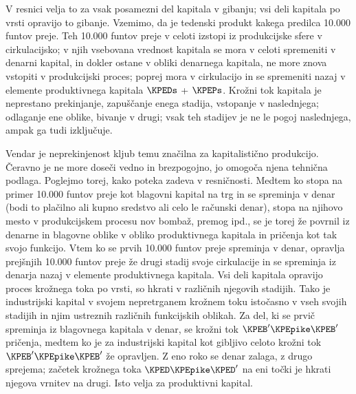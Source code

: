 \documentclass[kapital_02.tex]{subfiles}
\begin{document}
V resnici velja to za vsak posamezni del kapitala v gibanju; vsi deli kapitala po vrsti opravijo to gibanje. Vzemimo, da je tedenski produkt kakega predilca 10.000 funtov preje. Teh 10.000 funtov preje v celoti izstopi iz produkcijske sfere v cirkulacijsko; v njih vsebovana vrednost kapitala se mora v celoti spremeniti v denarni kapital, in dokler ostane v obliki denarnega kapitala, ne more znova vstopiti v produkcijski proces; poprej mora v cirkulacijo in se spremeniti nazaj v elemente produktivnega kapitala \( \KPEDs \) + \( \KPEPs \). Krožni tok kapitala je neprestano prekinjanje, zapuščanje enega stadija, vstopanje v naslednjega; odlaganje ene oblike, bivanje v drugi; vsak teh stadijev je ne le pogoj naslednjega, ampak ga tudi izključuje.

Vendar je neprekinjenost kljub temu značilna za kapitalistično produkcijo. Čeravno je ne more doseči vedno in brezpogojno, jo omogoča njena tehnična podlaga. Poglejmo torej, kako poteka zadeva v resničnosti. Medtem ko stopa na primer 10.000 funtov preje kot blagovni kapital na trg in se spreminja v denar (bodi to plačilno ali kupno sredstvo ali celo le računski denar), stopa na njihovo mesto v produkcijskem procesu nov bombaž, premog ipd., se je torej že povrnil iz denarne in blagovne oblike v obliko produktivnega kapitala in pričenja kot tak svojo funkcijo. Vtem ko \KPEstran se prvih 10.000 funtov preje spreminja v denar, opravlja prejšnjih 10.000 funtov preje že drugi stadij svoje cirkulacije in se spreminja iz denarja nazaj v elemente produktivnega kapitala. Vsi deli kapitala opravijo proces krožnega toka po vrsti, so hkrati v različnih njegovih stadijih. Tako je industrijski kapital v svojem nepretrganem krožnem toku istočasno v vseh svojih stadijih in njim ustreznih različnih funkcijskih oblikah. Za del, ki se prvič spreminja iz blagovnega kapitala v denar, se krožni tok \( \KPEB' \KPEpike \KPEB' \) pričenja, medtem ko je za industrijski kapital kot gibljivo celoto krožni tok \( \KPEB' \KPEpike \KPEB' \) že opravljen. Z eno roko se denar zalaga, z drugo sprejema; začetek krožnega toka \( \KPED \KPEpike \KPED' \) na eni točki je hkrati njegova vrnitev na drugi. Isto velja za produktivni kapital.
\end{document}
